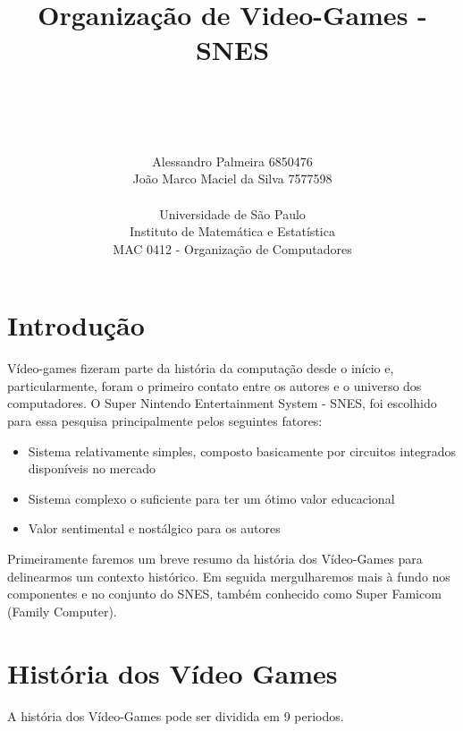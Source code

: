 \documentclass[paper=a4, fontsize=11pt]{scrartcl}	%
\title{ \vspace{-1in} 	\usefont{OT1}{bch}{b}{n}
		\huge \strut Organização de Video-Games - SNES \strut \\
		\Large \bfseries \strut \strut
}
\author{ 									\usefont{OT1}{bch}{m}{n}
        Alessandro Palmeira \hspace{7.37cm} 6850476
        \\		\usefont{OT1}{bch}{m}{n}
        João Marco Maciel da Silva  \hspace{5.7cm} 7577598
        \\		\usefont{OT1}{bch}{m}{n}
        \\Universidade de São Paulo\\	\usefont{OT1}{bch}{m}{n}
        Instituto de Matemática e Estatística\\
        \usefont{OT1}{bch}{m}{n}
                MAC 0412 - Organização de Computadores
}
\date{}
\numberwithin{equation}{section}															%
\numberwithin{figure}{section}																%
\numberwithin{table}{section}																%
\begin{document}
\maketitle
\section{Introdução}
Vídeo-games fizeram parte da história da computação desde o início e, particularmente, foram o primeiro contato entre os autores e o universo dos computadores. O Super Nintendo Entertainment System - SNES, foi escolhido para essa pesquisa principalmente pelos seguintes fatores:
\begin{itemize}
  \item{Sistema relativamente simples, composto basicamente por circuitos integrados disponíveis no mercado}
  \item{Sistema complexo o suficiente para ter um ótimo valor educacional}
  \item{Valor sentimental e nostálgico para os autores}
\end{itemize}
Primeiramente faremos um breve resumo da história dos Vídeo-Games para delinearmos um contexto histórico. Em seguida mergulharemos mais à fundo nos componentes e no conjunto do SNES, também conhecido como Super Famicom (Family Computer).

\section{História dos Vídeo Games}
A história dos Vídeo-Games pode ser dividida em 9 periodos.
\end{document}

